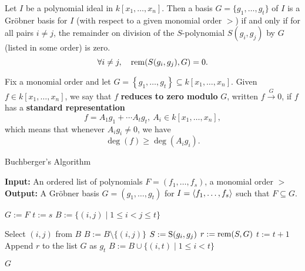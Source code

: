 \begin{theorem}\label{def:Buchberger’s Criterion} %
    Let $I$ be a polynomial ideal in $k[x_1, \dots, x_n]$. 
    Then a basis $G = \{g_1, \dots , g_t\}$ of $I$ is a Gr{\"o}bner basis for $I$ (with respect to a given monomial order $>$)
    if and only if for all pairs $i \neq j$, the remainder on division of the $S$-polynomial $S(g_i, g_j)$ by $G$ (listed in some order) is zero.
    \[ \forall i \neq j, \quad \operatorname{rem}(S(g_i, g_j), G) = 0. \]
\end{theorem}

\begin{definition}\label{def:reduces_to_zero} %
    Fix a monomial order and let $G = \left\{g_1, \ldots , g_t\right\} \subseteq k[x_1, \ldots , x_n]$.
    Given $f \in k[x_1, \ldots , x_n]$, we say that $f$ \textbf{reduces to zero modulo} $G$, written $f \xrightarrow{G} 0$,
    if $f$ has a \textbf{standard representation}
    \[ f = A_1g_1 + \cdots A_tg_t,\ A_i \in k[x_1, \ldots , x_n],\]
    which means that whenever $A_ig_i \neq 0$, we have
    \[\operatorname{deg}(f) \geq \operatorname{deg}(A_ig_i).\]
\end{definition}

\begin{latexonly}
\begin{algorithm}\label{alg:Buchberger's_Algorithm} %
    \caption{Buchberger's Algorithm}
    \begin{algorithmic}[1]
    \Statex \textbf{Input:} An ordered list of polynomials $F = (f_1, \dots, f_s)$, a monomial order $>$
    \Statex \textbf{Output:} A Gr{\"o}bner basis $G = (g_1, \dots, g_t)$ for $I = \langle f_1, \dots, f_s \rangle$ such that $F \subseteq G$.
    
    \State $G := F$ 
    \State $t := s$ 
    \State $B := \{(i, j) \mid 1 \le i < j \le t\}$ 
    
        \State Select $(i, j)$ from $B$
        \State $B := B \setminus \{(i, j)\}$
        \State $S := \operatorname{S}(g_i, g_j)$ 
        \State $r := \operatorname{rem}(S, G)$ 
            \State $t := t + 1$
            \State Append $r$ to the list $G$ as $g_t$ 
            \State $B := B \cup \{(i, t) \mid 1 \le i < t\}$ 
        \EndIf
    \EndWhile
    
    \State \Return $G$
    \end{algorithmic}
\end{algorithm}
\end{latexonly}

